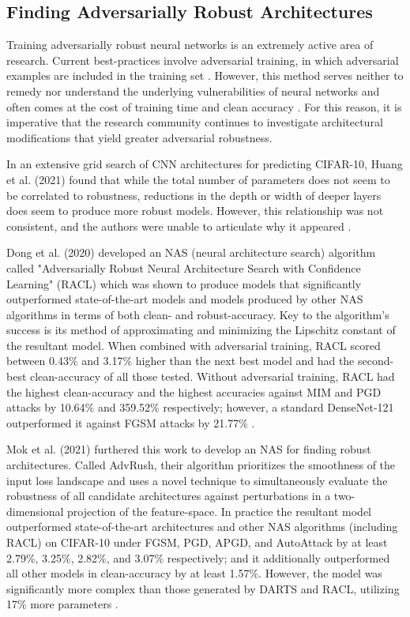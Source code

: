 \documentclass[10pt,twocolumn,letterpaper]{article}
\begin{document}
  \subsection{Finding Adversarially Robust Architectures}
    Training adversarially robust neural networks is an extremely active area of research. Current best-practices involve adversarial training, in which adversarial examples are included in the training set \cite{Madry}. However, this method serves neither to remedy nor understand the underlying vulnerabilities of neural networks and often comes at the cost of training time and clean accuracy \cite{RobustVsAccuracy}. For this reason, it is imperative that the research community continues to investigate architectural modifications that yield greater adversarial robustness.

    In an extensive grid search of CNN architectures for predicting CIFAR-10, Huang et al. (2021) found that while the total number of parameters does not seem to be correlated to robustness, reductions in the depth or width of deeper layers does seem to produce more robust models. However, this relationship was not consistent, and the authors were unable to articulate why it appeared \cite{Huang}.

    Dong et al. (2020) developed an NAS (neural architecture search) algorithm called "Adversarially Robust Neural Architecture Search with Confidence Learning" (RACL) which was shown to produce models that significantly outperformed state-of-the-art models and models produced by other NAS algorithms in terms of both clean- and robust-accuracy. Key to the algorithm's success is its method of approximating and minimizing the Lipschitz constant of the resultant model. When combined with adversarial training, RACL scored between 0.43\% and 3.17\% higher than the next best model and had the second-best clean-accuracy of all those tested. Without adversarial training, RACL had the highest clean-accuracy and the highest accuracies against MIM and PGD attacks by 10.64\% and 359.52\% respectively; however, a standard DenseNet-121 outperformed it against FGSM attacks by 21.77\% \cite{RACL}.

    Mok et al. (2021) furthered this work to develop an NAS for finding robust architectures. Called AdvRush, their algorithm prioritizes the smoothness of the input loss landscape and uses a novel technique to simultaneously evaluate the robustness of all candidate architectures against perturbations in a two-dimensional projection of the feature-space. In practice the resultant model outperformed state-of-the-art architectures and other NAS algorithms (including RACL) on CIFAR-10 under FGSM, PGD, APGD, and AutoAttack by at least 2.79\%, 3.25\%, 2.82\%, and 3.07\% respectively; and it additionally outperformed all other models in clean-accuracy by at least 1.57\%. However, the model was significantly more complex than those generated by DARTS and RACL, utilizing 17\% more parameters \cite{AdvRush}.
\end{document}
